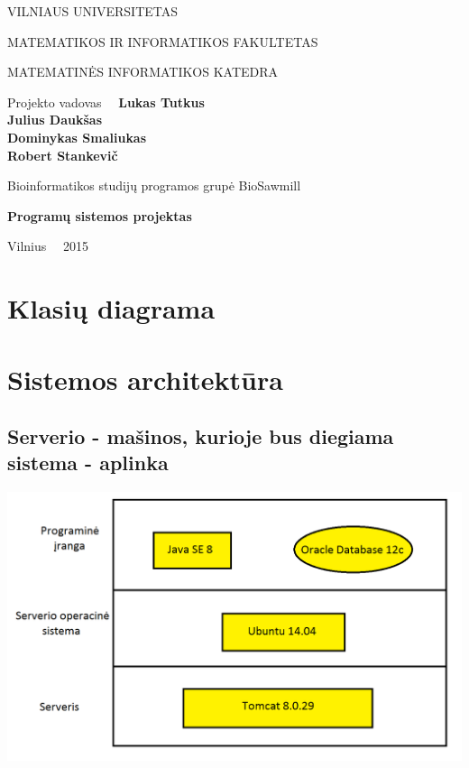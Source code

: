 \documentclass[a4paper,12pt]{article}
\begin{document}
\graphicspath{ {/} }

\renewcommand{\cftdot}{.}	
\renewcommand{\cftsecleader}{\cftdotfill{\cftdotsep}}

\thispagestyle{empty} %


\begin{center}
 VILNIAUS UNIVERSITETAS 
 
MATEMATIKOS IR INFORMATIKOS FAKULTETAS

MATEMATINĖS INFORMATIKOS KATEDRA

\vspace{4cm}

Projekto vadovas \ \ \textbf{Lukas Tutkus} \\
\textbf{Julius Daukšas} \\
\textbf{Dominykas Smaliukas} \\
\textbf{Robert Stankevič} \\

\vspace{0.2cm}

Bioinformatikos studijų programos grupė BioSawmill



\vspace{3cm}
\textbf{\Large Programų sistemos projektas}\\


\vfill

Vilnius \ \  2015
\end{center}



\clearpage

\tableofcontents
\clearpage


\section{Klasių diagrama}

\section{Sistemos architektūra}
\subsection{Serverio - mašinos, kurioje bus diegiama sistema - aplinka}
\includegraphics[scale=0.5]{architektura1}
\end{document}
